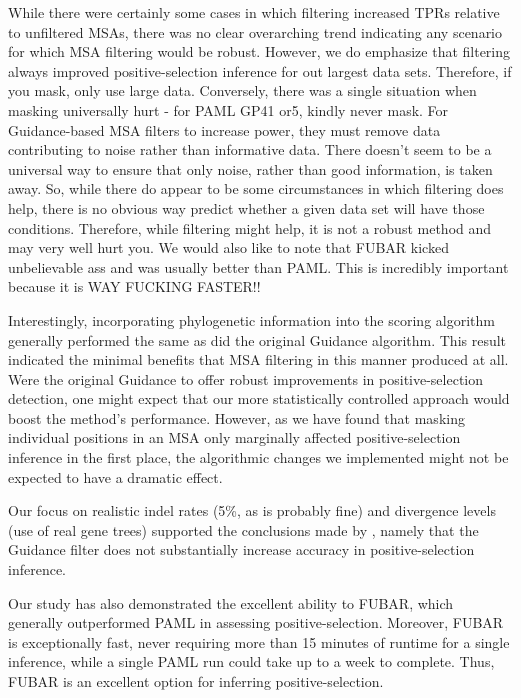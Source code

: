 \documentclass[11pt]{article}
\begin{document}
While there were certainly some cases in which filtering increased TPRs relative to unfiltered MSAs, there was no clear overarching trend indicating any scenario for which MSA filtering would be robust. However, we do emphasize that filtering always improved positive-selection inference for out largest data sets. Therefore, if you mask, only use large data.
Conversely, there was a single situation when masking universally hurt - for PAML GP41 or5, kindly never mask. 
For Guidance-based MSA filters to increase power, they must remove data contributing to noise rather than informative data. There doesn't seem to be a universal way to ensure that only noise, rather than good information, is taken away. So, while there do appear to be some circumstances in which filtering does help, there is no obvious way predict whether a given data set will have those conditions. Therefore, while filtering might help, it is not a robust method and may very well hurt you. 
We would also like to note that FUBAR kicked unbelievable ass and was usually better than PAML. This is incredibly important because it is WAY FUCKING FASTER!!

Interestingly, incorporating phylogenetic information into the scoring algorithm generally performed the same as did the original Guidance algorithm. This result indicated the minimal benefits that MSA filtering in this manner produced at all. Were the original Guidance to offer robust improvements in positive-selection detection, one might expect that our more statistically controlled approach would boost the method's performance. However, as we have found that masking individual positions in an MSA only marginally affected positive-selection inference in the first place, the algorithmic changes we implemented might not be expected to have a dramatic effect.

Our focus on realistic indel rates (5\%, as is probably fine) and divergence levels (use of real gene trees) supported the conclusions made by \citet{Jordan2012}, namely that the Guidance filter does not substantially increase accuracy in positive-selection inference.

Our study has also demonstrated the excellent ability to FUBAR, which generally outperformed PAML in assessing positive-selection. Moreover, FUBAR is exceptionally fast, never requiring more than 15 minutes of runtime for a single inference, while a single PAML run could take up to a week to complete. Thus, FUBAR is an excellent option for inferring positive-selection.
\end{document}
